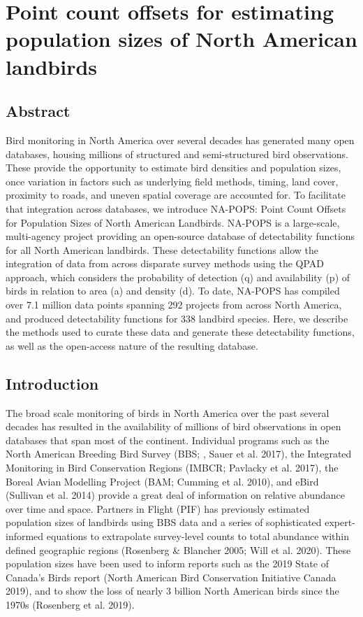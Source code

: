 \chapter{Point count offsets for estimating population sizes of North American landbirds}

\section{Abstract}
Bird monitoring in North America over several decades has generated many open databases, housing millions of structured and semi-structured bird observations. These provide the opportunity to estimate bird densities and population sizes, once variation in factors such as underlying field methods, timing, land cover, proximity to roads, and uneven spatial coverage are accounted for. To facilitate that integration across databases, we introduce NA-POPS: Point Count Offsets for Population Sizes of North American Landbirds. NA-POPS is a large-scale, multi-agency project providing an open-source database of detectability functions for all North American landbirds. These detectability functions allow the integration of data from across disparate survey methods using the QPAD approach, which considers the probability of detection (q) and availability (p) of birds in relation to area (a) and density (d). To date, NA-POPS has compiled over 7.1 million data points spanning 292 projects from across North America, and produced detectability functions for 338 landbird species. Here, we describe the methods used to curate these data and generate these detectability functions, as well as the open-access nature of the resulting database. 

\section{Introduction}
\par The broad scale monitoring of birds in North America over the past several decades has resulted in the availability of millions of bird observations in open databases that span most of the continent. Individual programs such as the North American Breeding Bird Survey (BBS; \citep{hudson_role_2017}, Sauer et al. 2017), the Integrated Monitoring in Bird Conservation Regions (IMBCR; Pavlacky et al. 2017), the Boreal Avian Modelling Project (BAM; Cumming et al. 2010), and eBird (Sullivan et al. 2014) provide a great deal of information on relative abundance over time and space. Partners in Flight (PIF) has previously estimated population sizes of landbirds using BBS data and a series of sophisticated expert-informed equations to extrapolate survey-level counts to total abundance within defined geographic regions (Rosenberg \& Blancher 2005; Will et al. 2020). These population sizes have been used to inform reports such as the 2019 State of Canada’s Birds report (North American Bird Conservation Initiative Canada 2019), and to show the loss of nearly 3 billion North American birds since the 1970s (Rosenberg et al. 2019).

